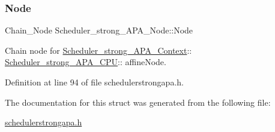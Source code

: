 \subsubsection{\texorpdfstring{Node}{Node}}
{\footnotesize\ttfamily Chain\+\_\+\+Node Scheduler\+\_\+strong\+\_\+\+A\+P\+A\+\_\+\+Node\+::\+Node}



Chain node for \hyperlink{structScheduler__strong__APA__Context}{Scheduler\+\_\+strong\+\_\+\+A\+P\+A\+\_\+\+Context}\+:\+: \hyperlink{structScheduler__strong__APA__CPU}{Scheduler\+\_\+strong\+\_\+\+A\+P\+A\+\_\+\+C\+PU}\+:\+: affine\+Node. 



Definition at line 94 of file schedulerstrongapa.\+h.



The documentation for this struct was generated from the following file\+:\begin{DoxyCompactItemize}
\item 
\hyperlink{schedulerstrongapa_8h}{schedulerstrongapa.\+h}\end{DoxyCompactItemize}
